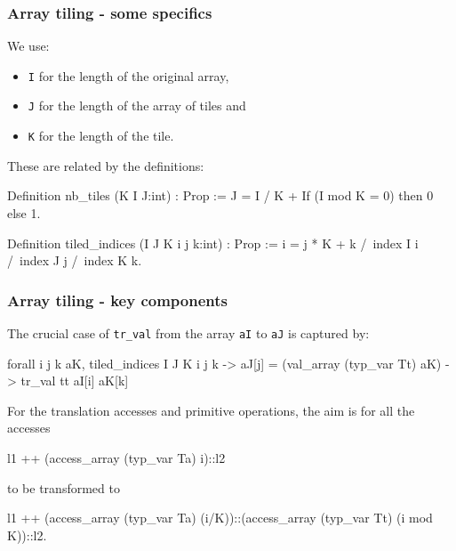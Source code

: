 \begin{frame}[fragile]
\frametitle{Array tiling - some specifics}

We use:
\begin{itemize}
	\item \texttt{I} for the length of the original array,
	\item \texttt{J} for the length of the array of tiles and
	\item \texttt{K} for the length of the tile.
\end{itemize}

\bigskip

These are related by the definitions:

\begin{coq}
Definition nb_tiles (K I J:int) : Prop :=
  J = I / K + If (I mod K = 0) then 0 else 1.

Definition tiled_indices (I J K i j k:int) : Prop :=
		i = j * K + k
	/\	index I i
	/\	index J j
  	/\	index K k.
\end{coq}

\end{frame}


\begin{frame}[fragile]
\frametitle{Array tiling - key components}



The crucial case of \texttt{tr\_val} from the array \texttt{aI} to \texttt{aJ} is captured by: 

\begin{coqs}
  forall i j k aK,		tiled_indices I J K i j k ->
				  aJ[j] = (val_array (typ_var Tt) aK) ->
				  tr_val tt aI[i] aK[k]
\end{coqs}

\bigskip \pause

For the translation accesses and primitive operations, the aim is for all the accesses

\begin{coqs}
  l1 ++ (access_array (typ_var Ta) i)::l2
\end{coqs}

to be transformed to

\begin{coqs}
  l1 ++ (access_array (typ_var Ta) (i/K))::(access_array (typ_var Tt) (i mod K))::l2.
\end{coqs}

\end{frame}


